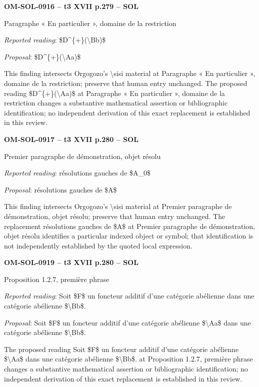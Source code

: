 \par\noindent\textbf{OM-SOL-0916 -- t3 XVII p.279 -- SOL}\par
Paragraphe « En particulier », domaine de la restriction\par
\emph{Reported reading}: \$D\textasciicircum{}\{+\}(\textbackslash{}Bb)\$\par
\emph{Proposal}: \$D\textasciicircum{}\{+\}(\textbackslash{}Aa)\$\par
This finding intersects Orgogozo's \textbackslash{}sisi material at Paragraphe « En particulier », domaine de la restriction; preserve that human entry unchanged. The proposed reading \$D\textasciicircum{}\{+\}(\textbackslash{}Aa)\$ at Paragraphe « En particulier », domaine de la restriction changes a substantive mathematical assertion or bibliographic identification; no independent derivation of this exact replacement is established in this review.\par
\par\noindent\textbf{OM-SOL-0917 -- t3 XVII p.280 -- SOL}\par
Premier paragraphe de démonstration, objet résolu\par
\emph{Reported reading}: résolutions gauches de \$A\_0\$\par
\emph{Proposal}: résolutions gauches de \$A\$\par
This finding intersects Orgogozo's \textbackslash{}sisi material at Premier paragraphe de démonstration, objet résolu; preserve that human entry unchanged. The replacement résolutions gauches de \$A\$ at Premier paragraphe de démonstration, objet résolu identifies a particular indexed object or symbol; that identification is not independently established by the quoted local expression.\par
\par\noindent\textbf{OM-SOL-0919 -- t3 XVII p.280 -- SOL}\par
Proposition 1.2.7, première phrase\par
\emph{Reported reading}: Soit \$F\$ un foncteur additif d'une catégorie abélienne dans une catégorie abélienne \$\textbackslash{}Bb\$.\par
\emph{Proposal}: Soit \$F\$ un foncteur additif d'une catégorie abélienne \$\textbackslash{}Aa\$ dans une catégorie abélienne \$\textbackslash{}Bb\$.\par
The proposed reading Soit \$F\$ un foncteur additif d'une catégorie abélienne \$\textbackslash{}Aa\$ dans une catégorie abélienne \$\textbackslash{}Bb\$. at Proposition 1.2.7, première phrase changes a substantive mathematical assertion or bibliographic identification; no independent derivation of this exact replacement is established in this review.\par
